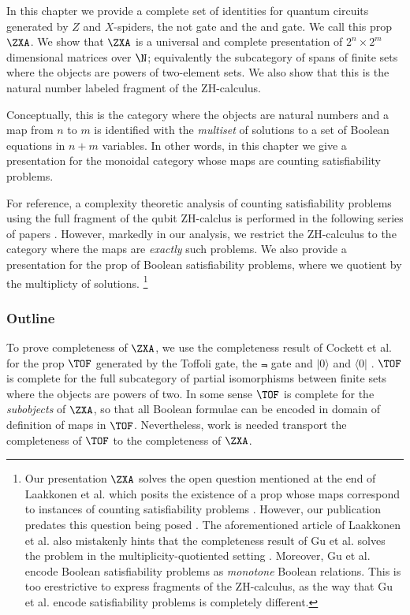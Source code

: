 In this chapter we provide a complete set of identities for quantum circuits generated by $Z$ and $X$-spiders, the {\sf not} gate and the {\sf and} gate.  We call this prop $\ZXA$. We show that $\ZXA$ is a  universal and complete presentation of $2^n \times 2^m$ dimensional matrices over $\N$; equivalently the subcategory of spans of finite sets where the objects are powers of two-element sets. We also show that this is the natural number labeled fragment of the ZH-calculus.

Conceptually, this is the category where the objects are natural numbers  and a map from $n$ to $m$ is identified with the {\em multiset} of solutions to a set of Boolean equations in $n+m$ variables. In other words, in this chapter we give a presentation for the monoidal category whose maps are counting satisfiability problems. 

For reference, a complexity theoretic analysis of counting satisfiability problems using the full fragment of the qubit ZH-calclus is performed in the following series of papers \cite{koni,konii,koniii}. However, markedly in our analysis, we restrict the ZH-calculus to the category where the maps are {\em exactly} such problems.  We also provide a presentation for the prop of Boolean satisfiability problems, where we quotient by the multiplicty of solutions.  \footnote{Our presentation $\ZXA$ solves the open question mentioned at the end of Laakkonen et al. which posits the existence of a prop whose maps correspond to instances of counting satisfiability problems  \cite[\S 2.2]{koniii}.  However, our publication predates this question being posed \cite{zxa}. The aforementioned article of Laakkonen et al. also mistakenly hints that the completeness result of Gu et al. solves the problem in the multiplicity-quotiented setting \cite{Gu2023}. Moreover, Gu et al. encode Boolean satisfiability problems as {\em monotone} Boolean relations.  This is too erestrictive to express fragments of the ZH-calculus, as the way that Gu et al. encode satisfiability problems is completely different.}
\subsubsection{Outline}
To prove completeness of $\ZXA$, we use the completeness result of Cockett et al. for the prop $\TOF$  generated by the Toffoli gate, the $\Not$ gate  and $|0\rangle$ and $\langle 0|$ \cite{tof}. $\TOF$ is complete for the full subcategory of partial isomorphisms between finite sets where the objects are powers of two.
In some sense $\TOF$ is complete for the {\em subobjects} of $\ZXA$, so that all Boolean formulae can be encoded in domain of definition of maps in  $\TOF$.  Nevertheless, work is needed transport the completeness of $\TOF$ to the completeness of $\ZXA$.


